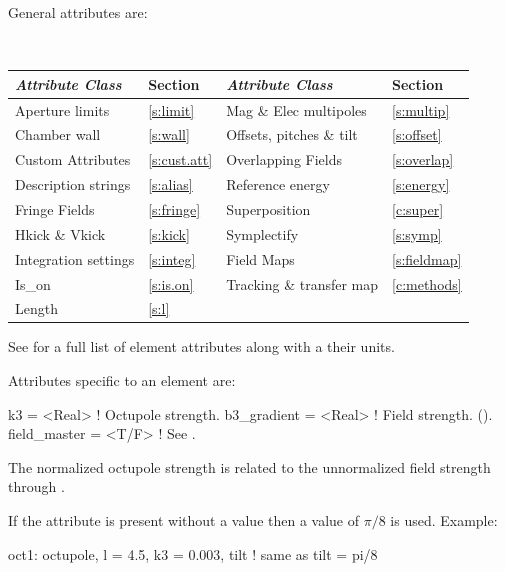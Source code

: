 {General  attributes are:
\begin{center}
\tt
\begin{tabular}{llll} \toprule
  {\sl Attribute Class}      & Section             & {\sl Attribute Class}      & Section            \\ \midrule
  Aperture limits            & \ref{s:limit}       & Mag \& Elec multipoles     & \ref{s:multip}     \\
  Chamber wall               & \ref{s:wall}        & Offsets, pitches \& tilt   & \ref{s:offset}     \\
  Custom Attributes          & \ref{s:cust.att}    & Overlapping Fields         & \ref{s:overlap}    \\
  Description strings        & \ref{s:alias}       & Reference energy           & \ref{s:energy}     \\ 
  Fringe Fields              & \ref{s:fringe}      & Superposition              & \ref{c:super}      \\
  Hkick \& Vkick             & \ref{s:kick}        & Symplectify                & \ref{s:symp}       \\
  Integration settings       & \ref{s:integ}       & Field Maps                 & \ref{s:fieldmap}   \\
  Is_on                      & \ref{s:is.on}       & Tracking \& transfer map   & \ref{c:methods}    \\ 
  Length                     & \ref{s:l}           &                            &                    \\
  \bottomrule
\end{tabular}
\end{center}
\toffset
See  for a full list of element attributes along with a their units.

Attributes specific to an  element are:
\begin{example}
  k3           = <Real>   ! Octupole strength.
  b3_gradient  = <Real>   ! Field strength. ().
  field_master = <T/F>    ! See .
\end{example}
The normalized octupole  strength is related to the unnormalized  field
strength through .

If the  attribute is present without a value then a value of 
$\pi/8$ is used.
Example:
\begin{example}
  oct1: octupole, l = 4.5, k3 = 0.003, tilt ! same as tilt = pi/8
\end{example}

}
